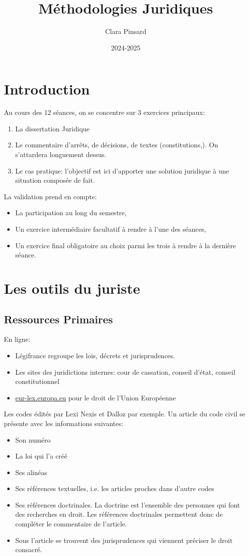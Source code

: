 \documentclass[math]{cours}
\author{Clara Pinsard}
\title{Méthodologies Juridiques}
\date{2024-2025}
\begin{document}
\bettertitle
\section*{Introduction}
Au cours des 12 séances, on se concentre sur 3 exercices principaux:
\begin{enumerate}
	\item La dissertation Juridique
	\item Le commentaire d'arrêts, de décisions, de textes (constitutions,).
	      On s'attardera longuement dessus.
	\item Le cas pratique: l'objectif est ici d'apporter une solution juridique à une situation composée de fait.
\end{enumerate}

La validation prend en compte:
\begin{itemize}
	\item La participation au long du semestre,
	\item Un exercice intermédiaire facultatif à rendre à l'une des séances,
	\item Un exercice final obligatoire au choix parmi les trois à rendre à la dernière séance.
\end{itemize}

\section*{Les outils du juriste}
\subsection*{Ressources Primaires}
En ligne:
\begin{itemize}
	\item Légifrance regroupe les lois, décrets et jurisprudences.
	\item Les sites des juridictions internes: cour de cassation, conseil d'état, conseil constitutionnel
	\item \url{eur-lex.europa.eu} pour le droit de l'Union Européenne
\end{itemize}

Les codes édités par Lexi Nexis et Dalloz par exemple.
Un article du code civil se présente avec les informations suivantes:
\begin{itemize}
	\item Son numéro
	\item La loi qui l'a créé
	\item Ses alinéas
	\item Ses références textuelles, i.e. les articles proches dans d'autre codes
	\item Ses références doctrinales. La doctrine est l'ensemble des personnes qui font des recherches en droit.
	      Les références doctrinales permettent donc de compléter le commentaire de l'article.
	\item Sous l'article se trouvent des jurisprudences qui viennent préciser le droit consacré.
\end{itemize}
\end{document}
